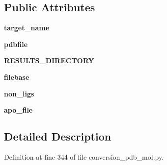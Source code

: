 \subsection*{Public Attributes}
\begin{DoxyCompactItemize}
\item 
\mbox{\label{classfragalysis__api_1_1xcimporter_1_1conversion__pdb__mol_1_1pdb__apo_a334c98d4dfa204c7673f2f0bffdc60e1}} 
{\bfseries target\+\_\+name}
\item 
\mbox{\label{classfragalysis__api_1_1xcimporter_1_1conversion__pdb__mol_1_1pdb__apo_a3c88c5322210bd36204fef2310fb80ce}} 
{\bfseries pdbfile}
\item 
\mbox{\label{classfragalysis__api_1_1xcimporter_1_1conversion__pdb__mol_1_1pdb__apo_a110bfcd93d73bebd25ec64b258bd5b6a}} 
{\bfseries R\+E\+S\+U\+L\+T\+S\+\_\+\+D\+I\+R\+E\+C\+T\+O\+RY}
\item 
\mbox{\label{classfragalysis__api_1_1xcimporter_1_1conversion__pdb__mol_1_1pdb__apo_a120a453eb2a3608650eda92ee0dc9ef9}} 
{\bfseries filebase}
\item 
\mbox{\label{classfragalysis__api_1_1xcimporter_1_1conversion__pdb__mol_1_1pdb__apo_a53ed76d729f8d926151385334f611545}} 
{\bfseries non\+\_\+ligs}
\item 
\mbox{\label{classfragalysis__api_1_1xcimporter_1_1conversion__pdb__mol_1_1pdb__apo_a9e655f451df734d5f78e8a41b8c47f89}} 
{\bfseries apo\+\_\+file}
\end{DoxyCompactItemize}


\subsection{Detailed Description}


Definition at line 344 of file conversion\+\_\+pdb\+\_\+mol.\+py.



